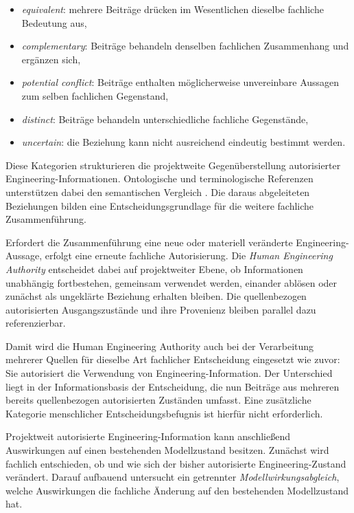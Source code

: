 \begin{itemize}
    \item \emph{equivalent}: mehrere Beiträge drücken im Wesentlichen
          dieselbe fachliche Bedeutung aus,

    \item \emph{complementary}: Beiträge behandeln denselben fachlichen
          Zusammenhang und ergänzen sich,

    \item \emph{potential conflict}: Beiträge enthalten möglicherweise
          unvereinbare Aussagen zum selben fachlichen Gegenstand,

    \item \emph{distinct}: Beiträge behandeln unterschiedliche fachliche
          Gegenstände,

    \item \emph{uncertain}: die Beziehung kann nicht ausreichend eindeutig
          bestimmt werden.
\end{itemize}

Diese Kategorien strukturieren die projektweite Gegenüberstellung
autorisierter Engineering-Informationen. Ontologische und terminologische
Referenzen unterstützen dabei den semantischen Vergleich
\cite{OrellanaMandrick2019,Lu2022}. Die daraus abgeleiteten Beziehungen
bilden eine Entscheidungsgrundlage für die weitere fachliche
Zusammenführung.

Erfordert die Zusammenführung eine neue oder materiell veränderte
Engineering-Aussage, erfolgt eine erneute fachliche Autorisierung. Die
\emph{Human Engineering Authority} entscheidet dabei auf projektweiter
Ebene, ob Informationen unabhängig fortbestehen, gemeinsam verwendet
werden, einander ablösen oder zunächst als ungeklärte Beziehung erhalten
bleiben. Die quellenbezogen autorisierten Ausgangszustände und ihre
Provenienz bleiben parallel dazu referenzierbar.

Damit wird die Human Engineering Authority auch bei der Verarbeitung
mehrerer Quellen für dieselbe Art fachlicher Entscheidung eingesetzt wie
zuvor: Sie autorisiert die Verwendung von Engineering-Information. Der
Unterschied liegt in der Informationsbasis der Entscheidung, die nun
Beiträge aus mehreren bereits quellenbezogen autorisierten Zuständen
umfasst. Eine zusätzliche Kategorie menschlicher Entscheidungsbefugnis ist
hierfür nicht erforderlich.

Projektweit autorisierte Engineering-Information kann anschließend
Auswirkungen auf einen bestehenden Modellzustand besitzen. Zunächst wird
fachlich entschieden, ob und wie sich der bisher autorisierte
Engineering-Zustand verändert. Darauf aufbauend untersucht ein getrennter
\emph{Modellwirkungsabgleich}, welche Auswirkungen die fachliche Änderung auf
den bestehenden Modellzustand hat.


